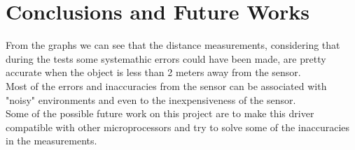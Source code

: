 \section{Conclusions and Future Works}
From the graphs we can see that the distance measurements, considering that during the tests some systemathic errors could have been made, are pretty accurate when the object is less than 2 meters away from the sensor. \\
Most of the errors and inaccuracies from the sensor can be associated with "noisy" environments and even to the inexpensiveness of the sensor.\\
Some of the possible future work on this project are to make this driver compatible with other microprocessors and try to solve some of the inaccuracies in the measurements. 